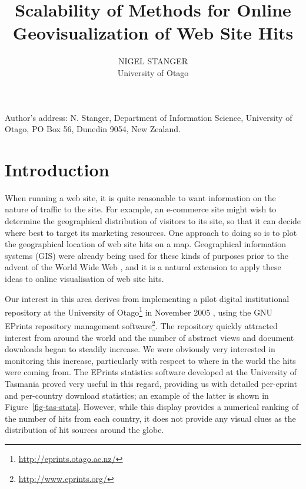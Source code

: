 \documentclass[acmtocl,acmnow]{acmtrans2m}
\title{Scalability of Methods for Online Geovisualization of Web Site Hits}
\author{NIGEL STANGER \\ University of Otago}
\begin{document}


            
\begin{bottomstuff} 
Author's address: N. Stanger, Department of Information Science,
University of Otago, PO Box 56, Dunedin 9054, New Zealand.
\end{bottomstuff}
            
\maketitle


\section{Introduction}
\label{sec-introduction}

When running a web site, it is quite reasonable to want information on
the nature of traffic to the site. For example, an e-commerce site might
wish to determine the geographical distribution of visitors to its site,
so that it can decide where best to target its marketing resources. One
approach to doing so is to plot the geographical location of web site
hits on a map. Geographical information systems (GIS) were already being
used for these kinds of purposes prior to the advent of the World Wide
Web \cite{Beau-JR-1991-GIS}, and it is a natural extension to apply
these ideas to online visualisation of web site hits.

Our interest in this area derives from implementing a pilot digital
institutional repository at the University of
Otago\footnote{\url{http://eprints.otago.ac.nz/}} in November 2005
\cite{Stan-N-2006-running}, using the GNU EPrints repository management
software\footnote{\url{http://www.eprints.org/}}. The repository quickly
attracted interest from around the world and the number of abstract
views and document downloads began to steadily increase. We were
obviously very interested in monitoring this increase, particularly with
respect to where in the world the hits were coming from. The EPrints
statistics software developed at the University of Tasmania
\cite{Sale-A-2006-stats} proved very useful in this regard, providing us
with detailed per-eprint and per-country download statistics; an example
of the latter is shown in Figure~\ref{fig-tas-stats}. However, while
this display provides a numerical ranking of the number of hits from
each country, it does not provide any visual clues as the distribution
of hit sources around the globe.
\end{document}
